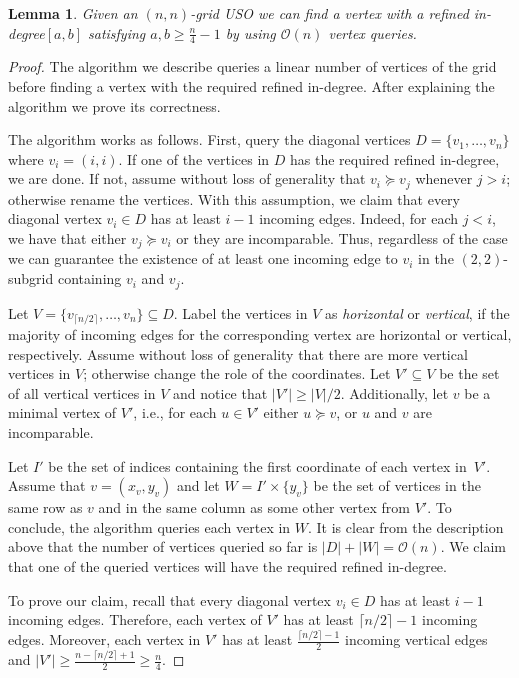 \documentclass[a4paper,10pt]{article}
\newtheorem{lemma}{Lemma}
\newcommand{\indegree}{refined in-degree\xspace}
\begin{document}
\begin{lemma}
 Given an $(n, n)$-grid USO we can find a vertex with a \indegree $[a,b]$ satisfying $a, b \geq \frac{n}{4} - 1$ by using $\mathcal{O}(n)$ vertex queries.
\end{lemma}

\begin{proof}
The algorithm we describe queries a linear number of vertices of the grid before finding a vertex with the required \indegree. 
After explaining the algorithm we prove its correctness.
  
The algorithm works as follows. First, query the diagonal vertices $D = \{v_1,\ldots, v_n\}$ where $v_i = (i,i)$. If one of the vertices in $D$ has the required \indegree, we are done. If not, assume without loss of generality that $v_i \succeq v_j$ whenever $j > i$; otherwise rename the vertices. 
With this assumption, we claim that every diagonal vertex $v_i \in D$ has at least $i - 1$ incoming edges. Indeed, for each $j < i$, we have that either $v_j \succeq v_i$ or they are incomparable. Thus, regardless of the case we can guarantee the existence of at least one incoming edge to $v_i$ in the $(2, 2)$-subgrid containing $v_i$ and $v_j$. 

Let $V = \{v_{\lceil n/2 \rceil},\ldots,v_n\} \subseteq D$.
Label the vertices in $V$ as \emph{horizontal}  or \emph{vertical}, if the majority of incoming edges for the corresponding vertex are horizontal  or vertical, respectively. 
Assume without loss of generality that there are more vertical vertices in $V$; otherwise change the role of the coordinates. 
Let $V' \subseteq V$ be the set of all vertical vertices in $V$ and notice that $|V'| \geq |V|/2$.
 Additionally, let $v$ be a minimal vertex of $V'$, i.e., for each $u\in V'$ either $u\succeq v$, or $u$ and $v$ are incomparable. 

Let $I'$ be the set of indices containing the first coordinate of each vertex in~$V'$.
Assume that $v = (x_v, y_v)$ and let $W = I'\times \{y_v\}$ be the set of vertices in the same row as $v$ and in the same column as some other vertex from $V'$.
To conclude, the algorithm queries each vertex in $W$.
It is clear from the description above that the number of vertices queried so far is $|D| + |W| = \mathcal{O}(n)$. 
We claim that one of the queried vertices will have the required \indegree.

To prove our claim, recall that every diagonal vertex $v_i \in D$ has at least $i - 1$ incoming edges.  
Therefore, each vertex of $V'$ has at least $\lceil n/2 \rceil - 1$ incoming edges. 
Moreover, each vertex in $V'$ has at least $\frac{\lceil n/2\rceil-1}{2}$ incoming vertical edges and $|V'| \geq \frac{n-\lceil n/2\rceil + 1}{2} \geq \frac{n}{4}$. 


\end{proof}
\end{document}
